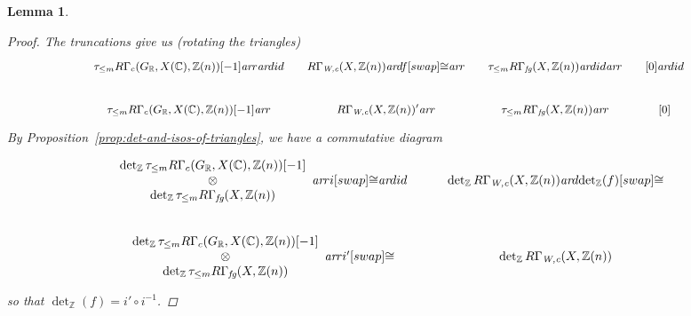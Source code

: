 \documentclass[10pt,a4paper,oneside,draft]{article}
\newcommand{\CC}{\mathbb{C}}
\newcommand{\RR}{\mathbb{R}}
\newcommand{\ZZ}{\mathbb{Z}}
\renewcommand{\det}{\operatorname{det}}
\newcommand{\ar}{\text{\it ar}}
\newcommand{\fg}{\text{\it fg}}
\newcommand{\Wc}{\text{\it W,c}}
\theoremstyle{myplain}
\newtheorem{lemma}[theorem]{Lemma}
\theoremstyle{mydefinition}
\numberwithin{equation}{section}
\begin{document}
\begin{lemma}
\begin{proof}
    The truncations give us (rotating the triangles)
    \[ \begin{tikzcd}[column sep=1em,font=\small]
        \tau_{\le m} R\Gamma_c (G_\RR, X (\CC), \ZZ (n))[-1] \ar{r}\ar{d}{id} & R\Gamma_\Wc (X, \ZZ (n))\ar{d}{f}[swap]{\cong}\ar{r} & \tau_{\le m} R\Gamma_\fg (X,\ZZ(n)) \ar{d}{id}\ar{r} & {[0]} \ar{d}{id} \\
        \tau_{\le m} R\Gamma_c (G_\RR, X (\CC), \ZZ (n))[-1] \ar{r} & R\Gamma_\Wc (X, \ZZ (n))' \ar{r} & \tau_{\le m} R\Gamma_\fg (X,\ZZ(n)) \ar{r} & {[0]}
      \end{tikzcd} \]
    By Proposition~\ref{prop:det-and-isos-of-triangles}, we have a commutative
    diagram
    \[ \begin{tikzcd}
        \begin{array}{c} \det_\ZZ \tau_{\le m} R\Gamma_c (G_\RR, X (\CC), \ZZ (n))[-1] \\ \otimes \\ \det_\ZZ \tau_{\le m} R\Gamma_\fg (X,\ZZ(n)) \end{array} \ar{r}{i}[swap]{\cong} \ar{d}{id} & \det_\ZZ R\Gamma_\Wc (X,\ZZ(n)) \ar{d}{\det_\ZZ (f)}[swap]{\cong} \\
        \begin{array}{c} \det_\ZZ \tau_{\le m} R\Gamma_c (G_\RR, X (\CC), \ZZ (n))[-1] \\ \otimes \\ \det_\ZZ \tau_{\le m} R\Gamma_\fg (X, \ZZ (n)) \end{array} \ar{r}{i'}[swap]{\cong} & \det_\ZZ R\Gamma_\Wc (X,\ZZ(n))
      \end{tikzcd} \]
    so that $\det_\ZZ (f) = i'\circ i^{-1}$.
  \end{proof}
\end{lemma}
\end{document}
